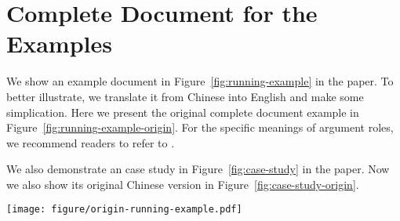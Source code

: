 \documentclass[11pt,a4paper]{article}
\begin{document}
\section{Complete Document for the Examples}
\label{appendix-running-example}
\label{appendix-case-study}

We show an example document in Figure~\ref{fig:running-example} in the paper.
To better illustrate, we translate it from Chinese into English and make some simplication.
Here we present the original complete document example in Figure~\ref{fig:running-example-origin}. 
For the specific meanings of argument roles, we recommend readers to refer to \citep{zheng-etal-2019-doc2edag}.

We also demonstrate an case study in Figure~\ref{fig:case-study} in the paper.
Now we also show its original Chinese version in  Figure~\ref{fig:case-study-origin}. 


\begin{figure*}[ht]
    \centering
    \texttt{[image: figure/origin-running-example.pdf]}
    \caption{The original complete document corresponding to the running example in Figure~\ref{fig:running-example}. Sentences in red color are presented in Figure~\ref{fig:running-example}.}
    \label{fig:running-example-origin}
\end{figure*}

 
\end{document}
